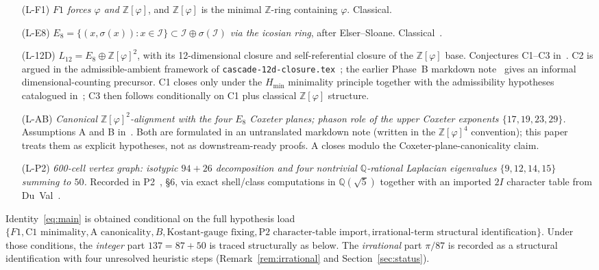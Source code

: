 \documentclass[12pt]{article}
\theoremstyle{definition}
\theoremstyle{remark}
\newcommand{\Q}{\mathbb{Q}}
\newcommand{\Z}{\mathbb{Z}}
\newcommand{\Zphi}{\mathbb{Z}[\varphi]}
\begin{document}
\begin{itemize}
  \item[(L-F1)] \emph{$F1$ forces $\varphi$ and $\Zphi$}, and $\Zphi$ is the minimal $\Z$-ring containing $\varphi$. Classical.
  \item[(L-E8)] \emph{$E_8 = \{(x,\sigma(x)) : x \in \mathcal{I}\} \subset \mathcal{I} \oplus \sigma(\mathcal{I})$ via the icosian ring}, after Elser--Sloane. Classical~\citep{ElserSloane1987, MoodyPatera1993}.
  \item[(L-12D)] \emph{$L_{12} = E_8 \oplus \Zphi^2$}, with its 12-dimensional closure and self-referential closure of the $\Zphi$ base. Conjectures C1--C3 in~\citep{Cascade12D}. C2 is argued in the admissible-ambient framework of \texttt{cascade-12d-closure.tex}~\citep{Cascade12D}; the earlier Phase~B markdown note~\citep{CascadePhaseB} gives an informal dimensional-counting precursor. C1 closes only under the $H_{\min}$ minimality principle together with the admissibility hypotheses catalogued in~\citep{Cascade12D}; C3 then follows conditionally on C1 plus classical $\Zphi$ structure.
  \item[(L-AB)] \emph{Canonical $\Zphi^2$-alignment with the four $E_8$ Coxeter planes; phason role of the upper Coxeter exponents $\{17, 19, 23, 29\}$.} Assumptions A and B in~\citep{CascadeABclosure}. Both are formulated in an untranslated markdown note (written in the $\Zphi^4$ convention); this paper treats them as explicit hypotheses, not as downstream-ready proofs. A closes modulo the Coxeter-plane-canonicality claim.
  \item[(L-P2)] \emph{600-cell vertex graph: isotypic $94{+}26$ decomposition and four nontrivial $\Q$-rational Laplacian eigenvalues $\{9, 12, 14, 15\}$ summing to $50$.} Recorded in P2~\citep{CascadeAlgSubstrate}, \S 6, via exact shell/class computations in $\Q(\sqrt 5)$ together with an imported $2I$ character table from Du~Val~\citep{DuVal1964}.
\end{itemize}

Identity~\eqref{eq:main} is obtained conditional on the full hypothesis load $\{F1, \text{C1 minimality}, \text{A canonicality}, B, \text{Kostant-gauge fixing}, \text{P2 character-table import}, \text{irrational-term structural identification}\}$. Under those conditions, the \emph{integer} part $137 = 87 + 50$ is traced structurally as below. The \emph{irrational} part $\pi/87$ is recorded as a structural identification with four unresolved heuristic steps (Remark~\ref{rem:irrational} and Section~\ref{sec:status}).
\end{document}
